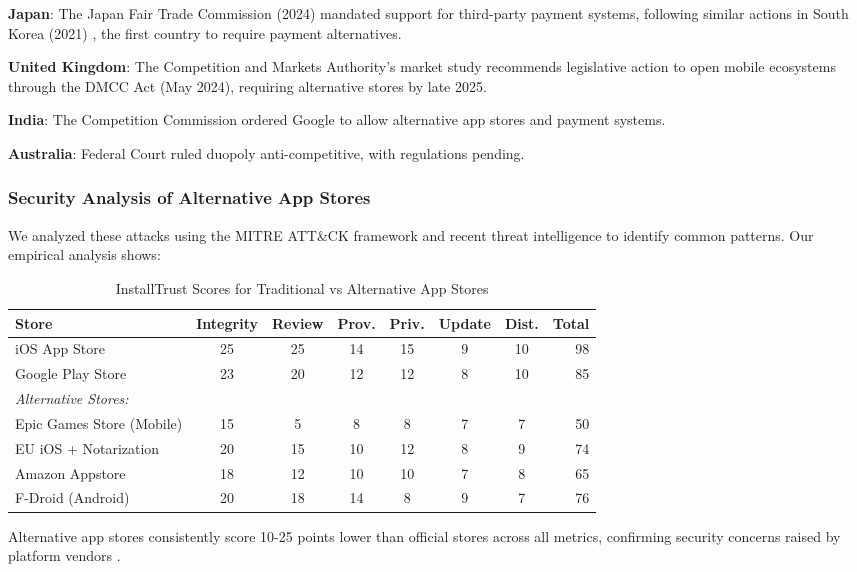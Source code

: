 \documentclass[11pt,a4paper]{article}
\begin{document}
\textbf{Japan}: The Japan Fair Trade Commission (2024) \cite{japan2024appstore} mandated support for third-party payment systems, following similar actions in South Korea (2021) \cite{korea2021appstore}, the first country to require payment alternatives.

\textbf{United Kingdom}: The Competition and Markets Authority's market study \cite{uk2024cma} recommends legislative action to open mobile ecosystems through the DMCC Act (May 2024), requiring alternative stores by late 2025.

\textbf{India}: The Competition Commission \cite{india2024antitrust} ordered Google to allow alternative app stores and payment systems.

\textbf{Australia}: Federal Court ruled duopoly anti-competitive, with regulations pending.

\subsubsection{Security Analysis of Alternative App Stores}

We analyzed these attacks using the MITRE ATT\&CK framework and recent threat intelligence \cite{forrester2024appsec} to identify common patterns. Our empirical analysis shows:

\begin{table}[h]
\centering
\caption{InstallTrust Scores for Traditional vs Alternative App Stores}
\begin{tabular}{lccccccr}
\toprule
\textbf{Store} & \textbf{Integrity} & \textbf{Review} & \textbf{Prov.} & \textbf{Priv.} & \textbf{Update} & \textbf{Dist.} & \textbf{Total} \\
\midrule
iOS App Store & 25 & 25 & 14 & 15 & 9 & 10 & 98 \\
Google Play Store & 23 & 20 & 12 & 12 & 8 & 10 & 85 \\
\midrule
\textit{Alternative Stores:} \\
Epic Games Store (Mobile) & 15 & 5 & 8 & 8 & 7 & 7 & 50 \\
EU iOS + Notarization & 20 & 15 & 10 & 12 & 8 & 9 & 74 \\
Amazon Appstore & 18 & 12 & 10 & 10 & 7 & 8 & 65 \\
F-Droid (Android) & 20 & 18 & 14 & 8 & 9 & 7 & 76 \\
\bottomrule
\end{tabular}
\end{table}

Alternative app stores consistently score 10-25 points lower than official stores across all metrics, confirming security concerns raised by platform vendors \cite{apple2023security,google2024android}.
\end{document}
